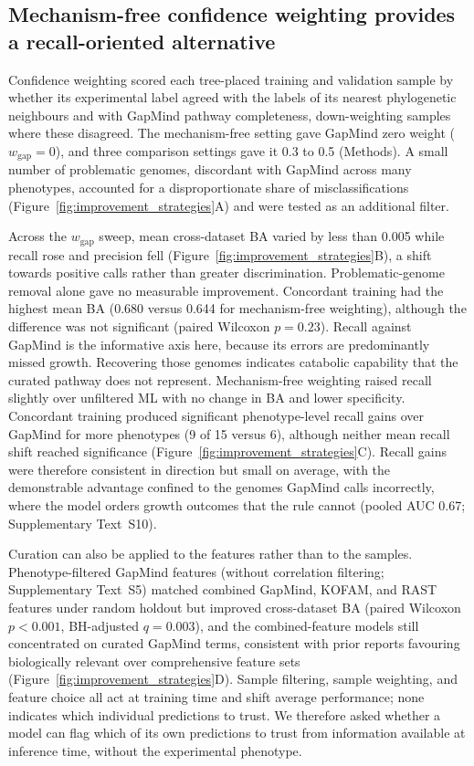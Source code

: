 \FloatBarrier{}

\subsection*{Mechanism-free confidence weighting provides a recall-oriented alternative}

Confidence weighting scored each tree-placed training and validation sample by whether its experimental label agreed with the labels of its nearest phylogenetic neighbours and with GapMind pathway completeness, down-weighting samples where these disagreed. The mechanism-free setting gave GapMind zero weight ($w_{\mathrm{gap}} = 0$), and three comparison settings gave it 0.3 to 0.5 (Methods).
A small number of problematic genomes, discordant with GapMind across many phenotypes, accounted for a disproportionate share of misclassifications (Figure~\ref{fig:improvement_strategies}A) and were tested as an additional filter.

Across the $w_{\mathrm{gap}}$ sweep, mean cross-dataset BA varied by less than 0.005 while recall rose and precision fell (Figure~\ref{fig:improvement_strategies}B), a shift towards positive calls rather than greater discrimination.
Problematic-genome removal alone gave no measurable improvement.
Concordant training had the highest mean BA (0.680 versus 0.644 for mechanism-free weighting), although the difference was not significant (paired Wilcoxon $p = 0.23$).
Recall against GapMind is the informative axis here, because its errors are predominantly missed growth. Recovering those genomes indicates catabolic capability that the curated pathway does not represent.
Mechanism-free weighting raised recall slightly over unfiltered ML with no change in BA and lower specificity.
Concordant training produced significant phenotype-level recall gains over GapMind for more phenotypes (9 of 15 versus 6), although neither mean recall shift reached significance (Figure~\ref{fig:improvement_strategies}C).
Recall gains were therefore consistent in direction but small on average, with the demonstrable advantage confined to the genomes GapMind calls incorrectly, where the model orders growth outcomes that the rule cannot (pooled AUC 0.67; Supplementary Text~S10).

Curation can also be applied to the features rather than to the samples.
Phenotype-filtered GapMind features (without correlation filtering; Supplementary Text~S5) matched combined GapMind, KOFAM, and RAST features under random holdout but improved cross-dataset BA (paired Wilcoxon $p<0.001$, BH-adjusted $q=0.003$), and the combined-feature models still concentrated on curated GapMind terms, consistent with prior reports favouring biologically relevant over comprehensive feature sets~\cite{Li2023-up} (Figure~\ref{fig:improvement_strategies}D).
Sample filtering, sample weighting, and feature choice all act at training time and shift average performance; none indicates which individual predictions to trust.
We therefore asked whether a model can flag which of its own predictions to trust from information available at inference time, without the experimental phenotype.


